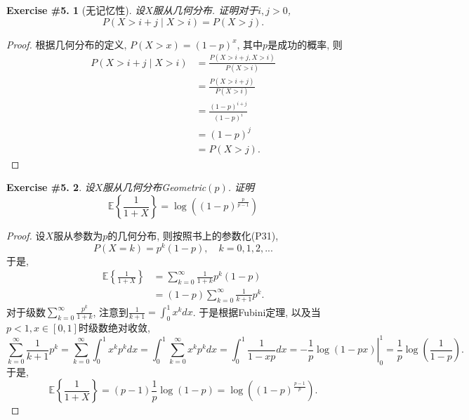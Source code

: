 \documentclass[UTF8, a4paper]{article}
\newtheorem{exercise}{Exercise \#5.}
\begin{document}
\begin{framed}
\begin{exercise}[无记忆性]
    设\(X\)服从几何分布. 证明对于\(i,j > 0\), 
    $$
P(X>i+j \mid X>i)=P(X>j).
$$
\end{exercise}
\end{framed}

\begin{proof}
根据几何分布的定义,
\(P(X > x) = (1 - p)^x\), 其中\(p\)是成功的概率, 则
$$
\begin{aligned}
    P(X>i+j \mid X>i) &= \frac{P(X>i+j, X>i)}{P(X>i)} \\
    &= \frac{P(X>i+j)}{P(X>i)} \\
    &= \frac{(1-p)^{i+j}}{(1-p)^i } \\
    &= (1-p)^j \\
    &= P(X>j).
\end{aligned}
$$
\end{proof}



\begin{framed}
\begin{exercise}
设\(X\)服从几何分布Geometric\((p)\). 证明 
$$
\mathbb{E}\left\{\frac{1}{1+X}\right\}=\log \left((1-p)^{\frac{p}{p-1}}\right)
$$
\end{exercise}
\end{framed}

\begin{proof}
设\(X\)服从参数为\(p\)的几何分布, 则按照书上的参数化(P31), 
$$
P(X = k) = p^k (1-p), \quad k = 0,1,2,...
$$
于是,
$$
\begin{aligned}
    \mathbb{E}\left\{\frac{1}{1+X}\right\} &= \sum_{k=0}^{\infty} \frac{1}{1+k} p^k (1-p) \\
    &= (1 - p) \sum_{k = 0}^{\infty} \frac{1}{k+1} p^k.
\end{aligned}
$$
对于级数\(\sum_{k=0}^{\infty}\frac{p^k}{1+k}\), 注意到\(\frac{1}{k+1} = \int_{0}^{1}x^k dx\).
于是根据Fubini定理, 以及当\(p < 1, x\in[0,1]\)时级数绝对收敛, 
$$
\sum_{k = 0}^{\infty} \frac{1}{k+1} p^k =  \sum_{k = 0}^{\infty} \int_{0}^{1}x^k p^k dx  = \int_{0}^{1} \sum_{k = 0}^{\infty} x^k p^k dx = \int_{0}^{1} \frac{1}{1 - xp} dx = \left.-\frac{1}{p}\log\left(1 - px\right) \right|_{0}^1 = \frac{1}{p}\log\left(\frac{1}{1-p}\right).
$$
于是, 
$$
\mathbb{E}\left\{\frac{1}{1+X}\right\} = (p-1) \frac{1}{p}\log\left({1-p}\right) = \log \left((1-p)^{\frac{p-1}{p}}\right).
$$

\end{proof}
\end{document}
